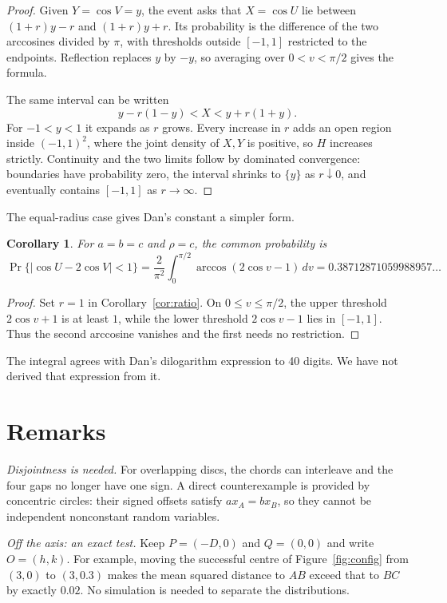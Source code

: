 \documentclass[11pt]{amsart}
\newtheorem{corollary}[theorem]{Corollary}
\theoremstyle{remark}
\begin{document}
\begin{proof}
Given $Y=\cos V=y$, the event asks that $X=\cos U$ lie between $(1+r)y-r$ and $(1+r)y+r$. Its probability is the difference of the two arccosines divided by $\pi$, with thresholds outside $[-1,1]$ restricted to the endpoints. Reflection replaces $y$ by $-y$, so averaging over $0<v<\pi/2$ gives the formula.

The same interval can be written
\[
y-r(1-y)<X<y+r(1+y).
\]
For $-1<y<1$ it expands as $r$ grows. Every increase in $r$ adds an open region inside $(-1,1)^2$, where the joint density of $X,Y$ is positive, so $H$ increases strictly. Continuity and the two limits follow by dominated convergence: boundaries have probability zero, the interval shrinks to $\{y\}$ as $r\downarrow0$, and eventually contains $[-1,1]$ as $r\to\infty$.
\end{proof}

The equal-radius case gives Dan's constant a simpler form.

\begin{corollary}\label{cor:constant}
For $a=b=c$ and $\rho=c$, the common probability is
\[
\Pr\{|\cos U-2\cos V|<1\}=\frac{2}{\pi^2}\int_0^{\pi/2}\arccos(2\cos v-1)\,dv=0.38712871059988957\ldots
\]
\end{corollary}

\begin{proof}
Set $r=1$ in Corollary~\ref{cor:ratio}. On $0\le v\le\pi/2$, the upper threshold $2\cos v+1$ is at least $1$, while the lower threshold $2\cos v-1$ lies in $[-1,1]$. Thus the second arccosine vanishes and the first needs no restriction.
\end{proof}

The integral agrees with Dan's dilogarithm expression to 40 digits. We have not derived that expression from it.

\section{Remarks}\label{sec:remarks}

\emph{Disjointness is needed.} For overlapping discs, the chords can interleave and the four gaps no longer have one sign. A direct counterexample is provided by concentric circles: their signed offsets satisfy $a x_A=b x_B$, so they cannot be independent nonconstant random variables.

\emph{Off the axis: an exact test.} Keep $P=(-D,0)$ and $Q=(0,0)$ and write $O=(h,k)$. For example, moving the successful centre of Figure~\ref{fig:config} from $(3,0)$ to $(3,0.3)$ makes the mean squared distance to $AB$ exceed that to $BC$ by exactly $0.02$. No simulation is needed to separate the distributions.
\end{document}
